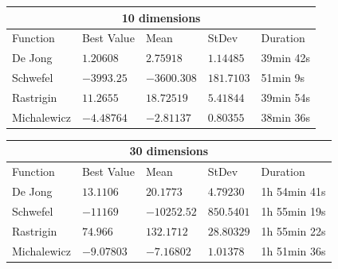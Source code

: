 \documentclass[12pt,leqno]{article}
\begin{document}
\begin{center}
  \begin{tabular}{|p{2.3cm}||p{3cm}|p{2cm}|p{2cm}|p{4.3cm}|} 
    \hline
    \multicolumn{5}{|c|}{10 dimensions} \\
    \hline
    Function    & Best Value & Mean & StDev & Duration \\ 
    \hline\hline
    De Jong     & $ 1.20608 $ & $ 2.75918 $ & $ 1.14485 $ & 39min 42s \\ 
    \hline
    Schwefel    & $ -3993.25 $ & $ -3600.308 $ & $ 181.7103 $ & 51min 9s \\ 
    \hline
    Rastrigin   & $ 11.2655 $ & $ 18.72519 $ & $ 5.41844 $ & 39min 54s \\ 
    \hline
    Michalewicz & $ -4.48764 $ & $ -2.81137 $ & $ 0.80355 $ & 38min 36s \\ 
    \hline
 \end{tabular}
\end{center}

\begin{center}
  \begin{tabular}{|p{2.3cm}||p{3cm}|p{2cm}|p{2cm}|p{4.3cm}|} 
    \hline
    \multicolumn{5}{|c|}{30 dimensions} \\
    \hline
    Function    & Best Value & Mean & StDev & Duration \\ 
    \hline\hline
    De Jong     & $ 13.1106 $ & $ 20.1773 $ & $ 4.79230 $ & 1h 54min 41s \\ 
    \hline
    Schwefel    & $ -11169 $ & $ -10252.52 $ & $ 850.5401 $ & 1h 55min 19s \\ 
    \hline
    Rastrigin   & $ 74.966 $ & $ 132.1712 $ & $ 28.80329 $ & 1h 55min 22s \\ 
    \hline
    Michalewicz & $ -9.07803 $ & $ -7.16802 $ & $ 1.01378 $ & 1h 51min 36s \\ 
    \hline
 \end{tabular}
\end{center}

\begin{center}
\end{center}
  
\end{document}
